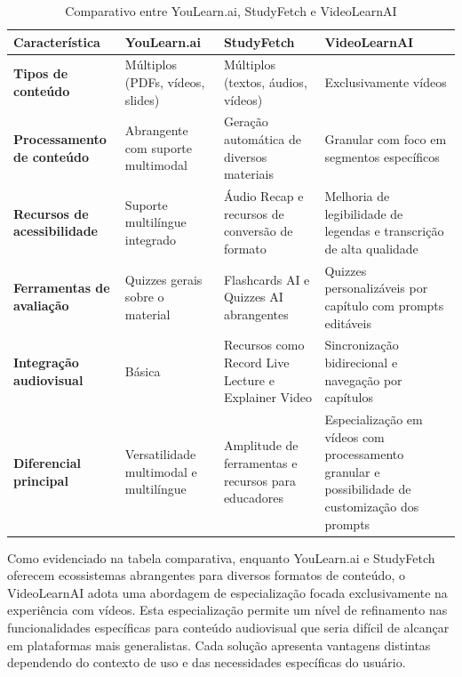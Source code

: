 \documentclass[tcc,capa]{texufpel}
\begin{document}
\begin{table}[H]
\centering
\caption{Comparativo entre YouLearn.ai, StudyFetch e VideoLearnAI}
\label{tab:comparativo_solucoes}
\begin{tabularx}{\textwidth}{|>{\raggedright\arraybackslash}X|>{\raggedright\arraybackslash}X|>{\raggedright\arraybackslash}X|>{\raggedright\arraybackslash}X|}
\hline
\textbf{Característica} & \textbf{YouLearn.ai} & \textbf{StudyFetch} & \textbf{VideoLearnAI} \\
\hline

\textbf{Tipos de conteúdo} & Múltiplos (PDFs, vídeos, slides) & Múltiplos (textos, áudios, vídeos) & Exclusivamente vídeos \\
\hline
\textbf{Processamento de conteúdo} & Abrangente com suporte multimodal & Geração automática de diversos materiais & Granular com foco em segmentos específicos \\
\hline
\textbf{Recursos de acessibilidade} & Suporte multilíngue integrado & Áudio Recap e recursos de conversão de formato & Melhoria de legibilidade de legendas e transcrição de alta qualidade \\
\hline
\textbf{Ferramentas de avaliação} & Quizzes gerais sobre o material & Flashcards AI e Quizzes AI abrangentes & Quizzes personalizáveis por capítulo com prompts editáveis \\
\hline
\textbf{Integração audiovisual} & Básica & Recursos como Record Live Lecture e Explainer Video & Sincronização bidirecional e navegação por capítulos \\
\hline
\textbf{Diferencial principal} & Versatilidade multimodal e multilíngue & Amplitude de ferramentas e recursos para educadores & Especialização em vídeos com processamento granular e possibilidade de customização dos prompts \\
\hline
\end{tabularx}
\end{table}

Como evidenciado na tabela comparativa, enquanto YouLearn.ai e StudyFetch oferecem ecossistemas abrangentes para diversos formatos de conteúdo, o VideoLearnAI adota uma abordagem de especialização focada exclusivamente na experiência com vídeos. Esta especialização permite um nível de refinamento nas funcionalidades específicas para conteúdo audiovisual que seria difícil de alcançar em plataformas mais generalistas. Cada solução apresenta vantagens distintas dependendo do contexto de uso e das necessidades específicas do usuário.
\end{document}
